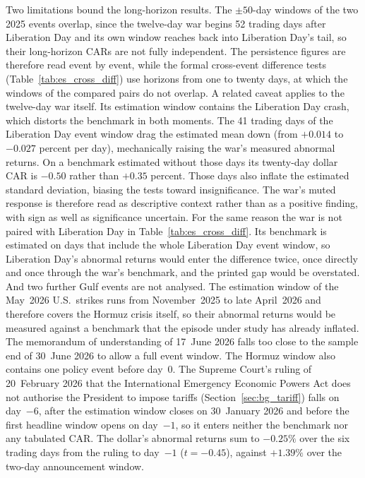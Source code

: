 Two limitations bound the long-horizon results. The $\pm 50$-day windows of the two 2025
events overlap, since the twelve-day war begins 52 trading days after Liberation Day and
its own window reaches back into Liberation Day's tail, so their long-horizon CARs are not
fully independent. The persistence
figures are therefore read event by event, while the formal cross-event difference tests
(Table~\ref{tab:es_cross_diff}) use horizons from one to twenty days, at which the
windows of the compared pairs do not overlap. A related caveat applies to the twelve-day war itself. Its estimation window contains the Liberation Day crash, which distorts the benchmark in both
moments. The 41 trading days of the Liberation Day event window drag the estimated mean down (from $+0.014$ to $-0.027$ percent per day), mechanically raising the war's measured abnormal returns. On a benchmark estimated
without those days its twenty-day dollar CAR is $-0.50$ rather than $+0.35$ percent. Those days also
inflate the estimated standard deviation, biasing the tests toward insignificance. The war's
muted response is therefore read as descriptive context rather than as a positive finding, with
sign as well as significance uncertain. For the same reason the war is not paired with Liberation Day in Table~\ref{tab:es_cross_diff}. Its benchmark is estimated on days that include the whole Liberation Day event window, so Liberation Day's abnormal returns would enter the difference twice, once directly and once through the war's benchmark, and the printed gap would be overstated. And two further Gulf events are not analysed. The estimation window of the May~2026 U.S.\ strikes runs from November~2025 to late April~2026 and therefore covers the Hormuz crisis itself, so their abnormal returns would be measured against a benchmark that the episode under study has already inflated. The memorandum of understanding of 17~June 2026 falls too close to the sample end of 30~June 2026 to allow a full event window. The Hormuz window also contains one policy event before day~0. The Supreme Court's ruling of 20~February 2026 that the International Emergency Economic Powers Act does not authorise the President to impose tariffs (Section~\ref{sec:bg_tariff}) falls on day~$-6$, after the estimation window closes on 30~January 2026 and before the first headline window opens on day~$-1$, so it enters neither the benchmark nor any tabulated CAR. The dollar's abnormal returns sum to $-0.25\%$ over the six trading days from the ruling to day~$-1$ ($t=-0.45$), against $+1.39\%$ over the two-day announcement window.

